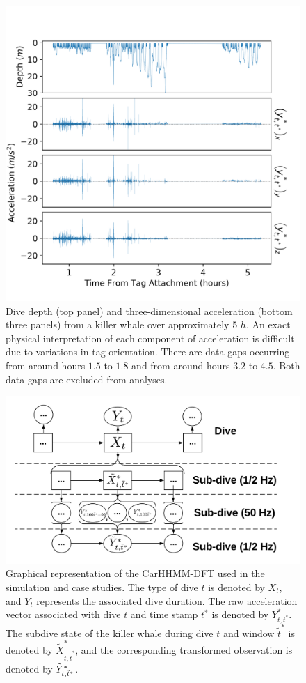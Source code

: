 
\begin{figure}[ht]
	\centering
	\includegraphics[width=5.25in]{../Plots/raw_data.png}
	\caption{Dive depth (top panel) and three-dimensional acceleration (bottom three panels) from a killer whale over approximately 5 $h$. An exact physical interpretation of each component of acceleration is difficult due to variations in tag orientation. There are data gaps occurring from around hours $1.5$ to $1.8$ and from around hours $3.2$ to $4.5$. Both data gaps are excluded from analyses.}
	\label{fig:data}
\end{figure}


\begin{figure}[ht]
	\centering
	\includegraphics[width=5in]{../Plots/CarHHMM-DFT.png}
	\caption{Graphical representation of the CarHHMM-DFT used in the simulation and case studies. The type of dive $t$ is denoted by $X_t$, and $Y_t$ represents the associated dive duration. The raw acceleration vector associated with dive $t$ and time stamp $t^*$ is denoted by $Y^*_{t,t^*}$. The subdive state of the killer whale during dive $t$ and window $\tilde t^*$ is denoted by $\tilde X^*_{t,\tilde t^*}$, and the corresponding transformed observation is denoted by $\tilde{Y}^*_{t,\tilde t^*}$.}
	\label{fig:CarHHMM-DFT}
\end{figure}


